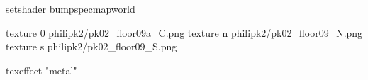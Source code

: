 setshader bumpspecmapworld

texture 0 philipk2/pk02_floor09a_C.png
texture n philipk2/pk02_floor09_N.png
texture s philipk2/pk02_floor09_S.png

texeffect "metal"
